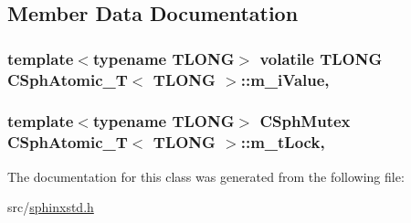 \subsection{Member Data Documentation}
\hypertarget{classCSphAtomic__T_a77e7e5bd9a16efeeea88d56b351df4fe}{
\subsubsection[{m\-\_\-i\-Value}]{\setlength{\rightskip}{0pt plus 5cm}template$<$typename T\-L\-O\-N\-G$>$ volatile T\-L\-O\-N\-G {\bf C\-Sph\-Atomic\-\_\-\-T}$<$ T\-L\-O\-N\-G $>$\-::m\-\_\-i\-Value\hspace{0.3cm}{\ttfamily [mutable]}, {\ttfamily [private]}}}\label{classCSphAtomic__T_a77e7e5bd9a16efeeea88d56b351df4fe}
\hypertarget{classCSphAtomic__T_a9edd4f1802870d4de39ae8c3707ac355}{
\subsubsection[{m\-\_\-t\-Lock}]{\setlength{\rightskip}{0pt plus 5cm}template$<$typename T\-L\-O\-N\-G$>$ C\-Sph\-Mutex {\bf C\-Sph\-Atomic\-\_\-\-T}$<$ T\-L\-O\-N\-G $>$\-::m\-\_\-t\-Lock\hspace{0.3cm}{\ttfamily [mutable]}, {\ttfamily [private]}}}\label{classCSphAtomic__T_a9edd4f1802870d4de39ae8c3707ac355}


The documentation for this class was generated from the following file\-:\begin{DoxyCompactItemize}
\item 
src/\hyperlink{sphinxstd_8h}{sphinxstd.\-h}\end{DoxyCompactItemize}
